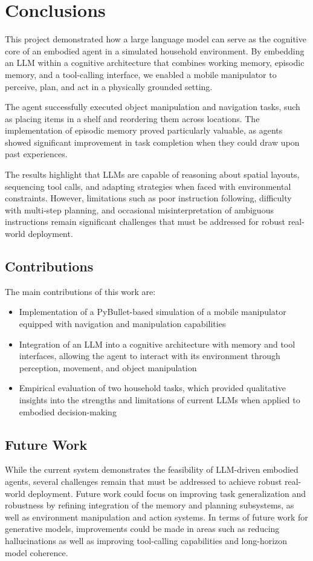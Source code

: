 \documentclass[../report.tex]{subfiles}
\begin{document}
\section{Conclusions}
\label{sec:conclusions}
This project demonstrated how a large language model can serve as the cognitive core of an embodied agent in a simulated household environment. By embedding an LLM within a cognitive architecture that combines working memory, episodic memory, and a tool-calling interface, we enabled a mobile manipulator to perceive, plan, and act in a physically grounded setting. 

The agent successfully executed object manipulation and navigation tasks, such as placing items in a shelf and reordering them across locations. The implementation of episodic memory proved particularly valuable, as agents showed significant improvement in task completion when they could draw upon past experiences.

The results highlight that LLMs are capable of reasoning about spatial layouts, sequencing tool calls, and adapting strategies when faced with environmental constraints. However, limitations such as poor instruction following, difficulty with multi-step planning, and occasional misinterpretation of ambiguous instructions remain significant challenges that must be addressed for robust real-world deployment.

\subsection{Contributions}
\label{sec:conclusions:contributions}
The main contributions of this work are:
\begin{itemize}
	\item Implementation of a PyBullet-based simulation of a mobile manipulator equipped with navigation and manipulation capabilities
	\item Integration of an LLM into a cognitive architecture with memory and tool interfaces, allowing the agent to interact with its environment through perception, movement, and object manipulation
	\item Empirical evaluation of two household tasks, which provided qualitative insights into the strengths and limitations of current LLMs when applied to embodied decision-making
\end{itemize}

\subsection{Future Work}
\label{sec:conclusions:future_work}
While the current system demonstrates the feasibility of LLM-driven embodied agents, several challenges remain that must be addressed to achieve robust real-world deployment. Future work could focus on improving task generalization and robustness by refining integration of the memory and planning subsystems, as well as environment manipulation and action systems. In terms of future work for generative models, improvements could be made in areas such as reducing hallucinations as well as improving tool-calling capabilities and long-horizon model coherence.
\end{document}
